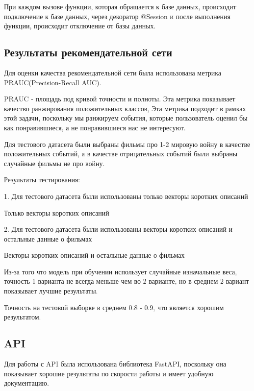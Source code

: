 При каждом вызове функции, которая обращается к базе данных, происходит подключение к базе данных, через декоратор
@Session и после выполнения функции, происходит отключение от базы данных.

\subsection{Результаты рекомендательной сети}

Для оценки качества рекомендательной сети была использована метрика PRAUC(Precision-Recall AUC).

PRAUC - площадь под кривой точности и полноты.
Эта метрика показывает качество ранжирования положительных классов, Эта метрика подходит в рамках этой задачи,
поскольку мы ранжируем события, которые пользователь оценил бы как понравившиеся, а не понравившиеся нас не интересуют.

Для тестового датасета были выбраны фильмы про 1-2 мировую войну в качестве положительных событий, а в качестве
отрицательных событий были выбраны случайные фильмы не про войну.

Результаты тестирования:

1. Для тестового датасета были использованы только векторы коротких описаний

\begin{image}
	\caption{Только векторы коротких описаний}
	\label{fig:test1}
\end{image}

\clearpage

2. Для тестового датасета были использованы векторы коротких описаний и остальные данные о фильмах

\begin{image}
	\caption{Векторы коротких описаний и остальные данные о фильмах}
	\label{fig:test2}
\end{image}

Из-за того что модель при обучении использует случайные изначальные веса, точность 1 варианта не всегда меньше чем
во 2 варианте, но в среднем 2 вариант показывает лучшие результаты.

Точность на тестовой выборке в среднем 0.8 - 0.9, что является хорошим результатом.

\subsection{API}

Для работы с API была использована библиотека FastAPI, поскольку она показывает хорошие результаты по скорости работы
и имеет удобную документацию.


